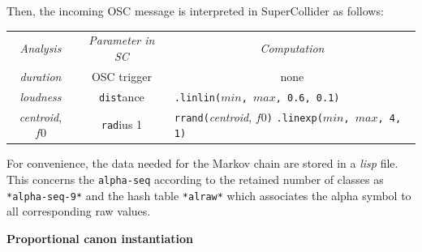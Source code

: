 \bigskip
\noindent Then, the incoming OSC message is interpreted in SuperCollider as follows:

\bigskip

\begin{tabular}{c|c|l}
\rowcolor{lightgray} \textit{Analysis}  & \textit{Parameter in SC}  & \multicolumn{1}{c}{\textit{Computation}}\\
\textsl{duration} &  OSC trigger   & \multicolumn{1}{c}{none}  \\
\textsl{loudness} &  \texttt{dist}ance   &  \texttt{.linlin($min$, $max$, 0.6, 0.1)} \\
\textsl{centroid}, $f0$ &  \texttt{rad}ius 1 & \makecell{\texttt{rrand(}\textsl{centroid}, $f0$\texttt{)}\\ \texttt{.linexp($min$, $max$, 4, 1)}} \\
\end{tabular}
\label{tab:apc}

  \bigskip

 For convenience, the data needed for the Markov chain are stored in a \textsl{lisp} file. This concerns the \texttt{alpha-seq} according to the retained number of classes as \texttt{*alpha-seq-9*} and the hash table \texttt{*alraw*} which associates the alpha symbol to all corresponding raw values.

\bigskip
\smallskip
  
  \textbf{
  Proportional canon instantiation }
  

